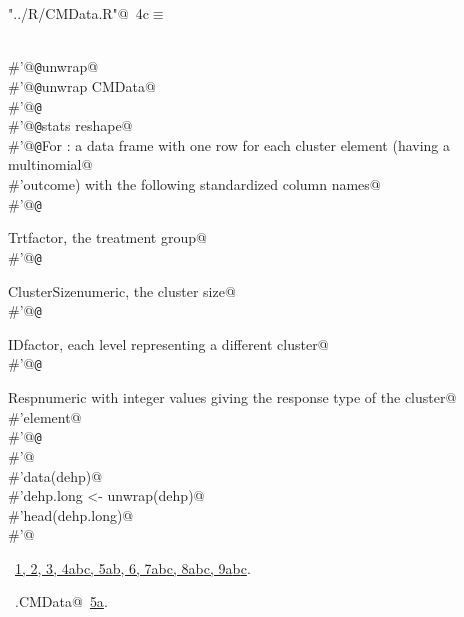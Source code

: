 \documentclass[reqno]{amsart}
\renewcommand{\NWtarget}[2]{\hypertarget{#1}{#2}}
\renewcommand{\NWlink}[2]{\hyperlink{#1}{#2}}
\begin{document}
\begin{flushleft} \small\label{scrap6}\raggedright\small
\NWtarget{nuweb4c}{} \verb@"../R/CMData.R"@\nobreak\ {\footnotesize {4c}}$\equiv$
\vspace{-1ex}
\begin{list}{}{} \item
\mbox{}\verb@@\\
\mbox{}\verb@#'@{\tt @}\verb@rdname unwrap@\\
\mbox{}\verb@#'@{\tt @}\verb@method unwrap CMData@\\
\mbox{}\verb@#'@{\tt @}\verb@export@\\
\mbox{}\verb@#'@{\tt @}\verb@importFrom stats reshape@\\
\mbox{}\verb@#'@{\tt @}\verb@return For : a data frame with one row for each cluster element (having a multinomial@\\
\mbox{}\verb@#'outcome) with the following standardized column names@\\
\mbox{}\verb@#'@{\tt @}\verb@return \item{Trt}{factor, the treatment group}@\\
\mbox{}\verb@#'@{\tt @}\verb@return \item{ClusterSize}{numeric, the cluster size}@\\
\mbox{}\verb@#'@{\tt @}\verb@return \item{ID}{factor, each level representing a different cluster}@\\
\mbox{}\verb@#'@{\tt @}\verb@return \item{Resp}{numeric with integer values giving the response type of the cluster@\\
\mbox{}\verb@#'element}@\\
\mbox{}\verb@#'@{\tt @}\verb@examples@\\
\mbox{}\verb@#'@\\
\mbox{}\verb@#'data(dehp)@\\
\mbox{}\verb@#'dehp.long <- unwrap(dehp)@\\
\mbox{}\verb@#'head(dehp.long)@\\
\mbox{}\verb@#'@\\
\mbox{}\verb@@{\NWsep}
\end{list}
\vspace{-1.5ex}
\footnotesize
\begin{list}{}{\setlength{\itemsep}{-\parsep}\setlength{\itemindent}{-\leftmargin}}
\item \NWtxtFileDefBy\ \NWlink{nuweb1}{1}\NWlink{nuweb2}{, 2}\NWlink{nuweb3}{, 3}\NWlink{nuweb4a}{, 4a}\NWlink{nuweb4b}{b}\NWlink{nuweb4c}{c}\NWlink{nuweb5a}{, 5a}\NWlink{nuweb5b}{b}\NWlink{nuweb6}{, 6}\NWlink{nuweb7a}{, 7a}\NWlink{nuweb7b}{b}\NWlink{nuweb7c}{c}\NWlink{nuweb8a}{, 8a}\NWlink{nuweb8b}{b}\NWlink{nuweb8c}{c}\NWlink{nuweb9a}{, 9a}\NWlink{nuweb9b}{b}\NWlink{nuweb9c}{c}.
\item \NWtxtIdentsUsed\nobreak\  \verb@unwrap.CMData@\nobreak\ \NWlink{nuweb5a}{5a}.
\item{}
\end{list}
\vspace{4ex}
\end{flushleft}
\end{document}
